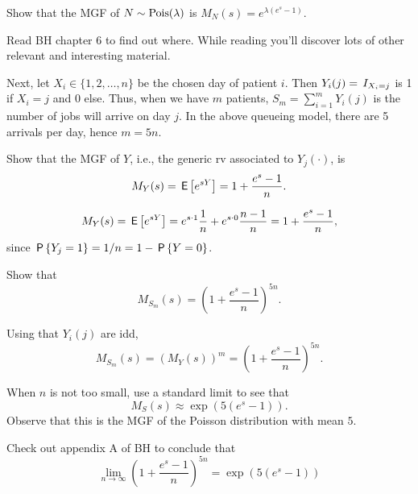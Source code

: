 \begin{exercise}
Show that the MGF of $N\sim \Pois{\lambda}$ is $M_{N}(s)= e^{\lambda(e^s-1)}$.
\begin{solution}
Read BH chapter 6 to find out where. While reading you'll discover lots of other relevant and interesting material.
\end{solution}
\end{exercise}

Next, let \(X_{i}\in\{1, 2, \ldots, n\}\) be the chosen day of patient \(i\).
Then \(Y_{i}(j)=\1{X_{i}=j}\) is 1 if \(X_i=j\) and 0 else.
Thus, when we have \(m\) patients, \(S_{m}=\sum_{i=1}^{m} Y_i(j)\) is the number of jobs will arrive on day \(j\). In the above queueing model, there are 5 arrivals per day, hence \(m=5n\).

\begin{exercise}
Show that the MGF of \(Y\), i.e., the generic rv associated to \(Y_j(\cdot)\), is
\begin{equation}
\label{eq:2}
M_Y(s) = \E{e^{s Y}}  = 1 + \frac{e^s-1}{n}.
\end{equation}
\begin{solution}
\begin{equation*}
M_Y(s) = \E{e^{s Y}} = e^{s\cdot 1} \frac{1}{n} + e^{s\cdot 0} \frac{n-1}{n} = 1 + \frac{e^s-1}{n},
\end{equation*}
since \(\P{Y_j=1} = 1/n = 1-\P{Y=0}\).
\end{solution}
\end{exercise}

\begin{exercise}
Show that
\begin{equation}
M_{S_{m}}(s) = \left( 1 + \frac{e^s-1}{n}\right)^{5n}.
\end{equation}
\begin{solution}
Using that  \(Y_i(j)\) are idd,
\begin{equation}
M_{S_{m}}(s) = \left( M_Y(s)\right)^m = \left( 1 + \frac{e^s-1}{n}\right)^{5n}.
\end{equation}
\end{solution}
\end{exercise}

\begin{exercise}
When \(n\) is not too small, use a standard limit to see that
\begin{equation}
M_S(s) \approx \exp(5(e^s-1)).
\end{equation}
Observe that this is the MGF of the Poisson distribution with mean \(5\).
\begin{solution}
Check out appendix A of BH to conclude that
\begin{equation}
\lim_{n\to\infty}\left( 1 + \frac{e^s-1}{n}\right)^{5n} =\exp(5(e^s-1))
\end{equation}
\end{solution}
\end{exercise}

